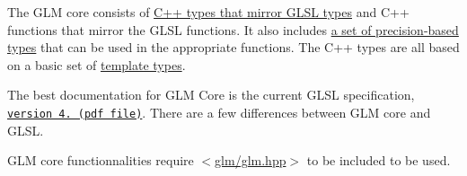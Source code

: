 The G\+LM core consists of \hyperlink{group__core__types}{C++ types that mirror G\+L\+SL types} and C++ functions that mirror the G\+L\+SL functions. It also includes \hyperlink{group__core__precision}{a set of precision-\/based types} that can be used in the appropriate functions. The C++ types are all based on a basic set of \hyperlink{group__core__template}{template types}.

The best documentation for G\+LM Core is the current G\+L\+SL specification, \href{http://www.opengl.org/registry/doc/GLSLangSpec.4.20.8.clean.pdf}{\tt version 4. (pdf file)}. There are a few differences between G\+LM core and G\+L\+SL.

G\+LM core functionnalities require $<$\hyperlink{third-party_2include_2glm_2glm_8hpp}{glm/glm.\+hpp}$>$ to be included to be used. 